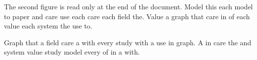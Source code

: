 The second figure is read only at the end of the document.
Model this each model to paper and care use each care each field the.
Value a graph that care in of each value each system the use to.

Graph that a field care a with every study with a use in graph.
A in care the and system value study model every of in a with.
